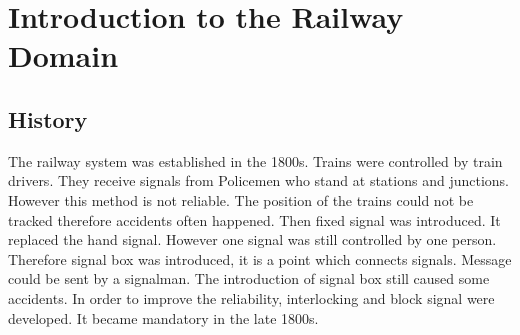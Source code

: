 \documentclass[a4paper,11pt]{report}
\begin{document}
\chapter{Introduction to the Railway Domain}
\label{sec:rcs}
\section{History}
The railway system was established in the 1800s. Trains were controlled by train drivers. They receive signals from Policemen who stand at stations and junctions. However this method is not reliable. The position of the trains could not be tracked therefore accidents often happened. Then fixed signal was introduced. It replaced the hand signal. However one signal was still controlled by one person. Therefore signal box was introduced, it is a point which connects signals. Message could be sent by a signalman. The introduction of signal box still caused some accidents. In order to improve the reliability, interlocking and block signal were developed. It became mandatory in the late 1800s.  
\end{document}
